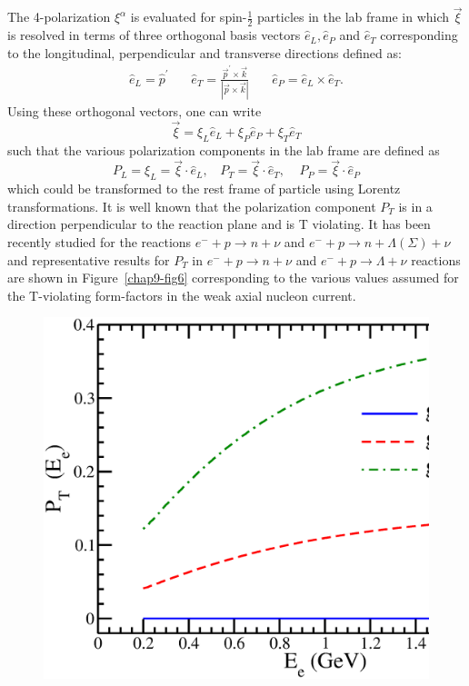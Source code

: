 The 4-polarization $\xi^\alpha$ is evaluated for spin-$\frac12$ particles in the lab frame in which $\vec{\xi}$ is resolved in  terms of three orthogonal basis vectors $\hat{e}_L,\hat{e}_P$ and $\hat{e}_T$ corresponding to the longitudinal, perpendicular and transverse directions defined as:
\begin{eqnarray}
\hat{e}_L= \hat{p}^\prime ~~~~~~~~ \hat{e}_T=\frac{\vec{p}^\prime\times \vec{k}}{|\vec{p}\times\vec{k}|}~~~~~~~~\hat{e}_P=\hat{e}_L\times\hat{e}_T. \label{chap9-eq41}
\end{eqnarray}
Using these orthogonal vectors, one can write
\begin{equation}
\vec{\xi}=\xi_L\hat{e}_L+\xi_P\hat{e}_P+\xi_T\hat{e}_T \label{chap9-eq42}
\end{equation}
such that the various polarization components in the lab frame are defined as 
\begin{equation}
P_{L}= \xi_L =\vec{\xi}\cdot \hat{e}_L,~~~~P_T=\vec{\xi}\cdot \hat{e}_T,~~~~~P_P=\vec{\xi}\cdot \hat{e}_P \label{chap9-eq43}
\end{equation} 
which could be transformed to the rest frame of particle using Lorentz transformations. It is well known that the polarization component $P_T$ is in a direction perpendicular to the reaction plane and is T violating. It has been recently studied \cite{key14} for the reactions $e^-+p\rightarrow n+\nu$ and $e^-+p\rightarrow n+\Lambda(\Sigma)+\nu$ and  representative results for $P_T$ in $e^-+p\rightarrow n+\nu$ and $e^-+p\rightarrow \Lambda+\nu$ reactions are shown in Figure~\ref{chap9-fig6} corresponding to the various values assumed for the T-violating form-factors in the weak axial nucleon current. 
\begin{figure}[H]
\centering
\includegraphics[scale=0.33]{src/images/chap9/lambda.eps}
\end{figure}
